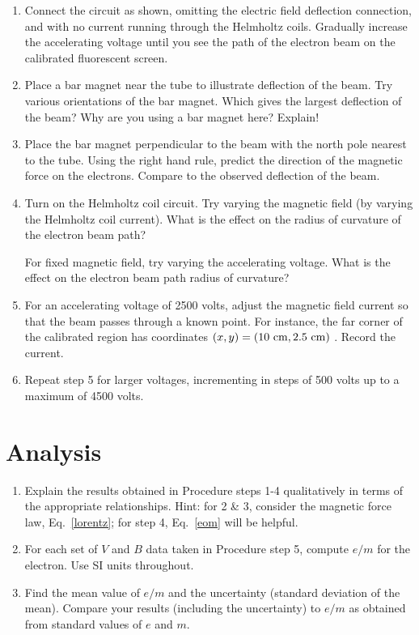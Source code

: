 \documentclass{tufte-handout}
\begin{document}
\begin{enumerate}
\item Connect the circuit as shown, omitting the electric
field deflection connection,  and with no current running through the
Helmholtz coils. Gradually increase the accelerating voltage until you
see the path of the electron beam on the calibrated fluorescent
screen.



\item Place a bar magnet near the tube to illustrate deflection of the beam. Try various orientations of the bar
magnet. Which gives the largest deflection of the beam?
Why are you using a bar magnet here? Explain!


\item Place the bar magnet perpendicular to the beam with the north pole
nearest to the tube. Using the right hand rule, predict the direction
of the magnetic force on the electrons. Compare to the observed
deflection of the beam.


\item Turn on the Helmholtz coil circuit. Try varying the
magnetic field (by varying the Helmholtz coil current). What is the
effect on the radius of curvature of the electron beam path?

For fixed magnetic field, try varying the accelerating voltage. What is
the effect on the electron beam path radius of curvature?


\item For an accelerating voltage of 2500 volts, adjust the magnetic field
  current so that the beam passes through a known point.  For instance, the far
  corner of the calibrated region has coordinates $(x,y) = (10~\rm{cm},
  2.5~\rm{cm})$ . Record the current.


\item Repeat step 5 for larger voltages, incrementing in
steps of 500 volts up to a maximum of 4500 volts.
\end{enumerate}

\section{Analysis}

\begin{enumerate}
\item Explain the results obtained in Procedure steps 1-4 qualitatively
in terms of the appropriate relationships. Hint: for 2 \& 3, consider
the magnetic force law, Eq.~\ref{lorentz}; for step 4, Eq.~\ref{eom} will be helpful.

\item For each set of $V$ and $B$ data taken in Procedure step 5, compute $e/m$
for the electron. Use SI units throughout.

\item Find the mean value of $e/m$ and the uncertainty (standard deviation of
the mean). Compare your results (including the uncertainty) to
$e/m$ as obtained from standard values of $e$ and $m$.
\end{enumerate}
\end{document}
